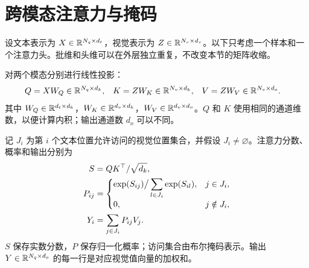 \section{跨模态注意力与掩码}\label{sec:attention}
设文本表示为 $X\in\mathbb R^{N_q\times d_t}$，视觉表示为 $Z\in\mathbb R^{N_v\times d_v}$。以下只考虑一个样本和一个注意力头。批维和头维可以在外层独立重复，不改变本节的矩阵收缩。

对两个模态分别进行线性投影：
\begin{align}\label{eq:att_projection}
 Q&=XW_Q\in\mathbb R^{N_q\times d_k},&
 K&=ZW_K\in\mathbb R^{N_v\times d_k},&
 V&=ZW_V\in\mathbb R^{N_v\times d_o}.
\end{align}
其中 $W_Q\in\mathbb R^{d_t\times d_k}$，$W_K\in\mathbb R^{d_v\times d_k}$，$W_V\in\mathbb R^{d_v\times d_o}$。$Q$ 和 $K$ 使用相同的通道维数，以便计算内积；输出通道数 $d_o$ 可以不同。

记 $J_i$ 为第 $i$ 个文本位置允许访问的视觉位置集合，并假设 $J_i\ne\varnothing$。注意力分数、概率和输出分别为
\begin{align}\label{eq:att_forward}
 S&=QK^\top/\sqrt{d_k},\notag\\
 P_{ij}&=\begin{cases}
 \exp(S_{ij})\big/\displaystyle\sum_{l\in J_i}\exp(S_{il}),&j\in J_i,\\
 0,&j\notin J_i,
 \end{cases}\notag\\
 Y_i&=\sum_{j\in J_i}P_{ij}V_j.
\end{align}
$S$ 保存实数分数，$P$ 保存归一化概率；访问集合由布尔掩码表示。输出 $Y\in\mathbb R^{N_q\times d_o}$ 的每一行是对应视觉值向量的加权和。

